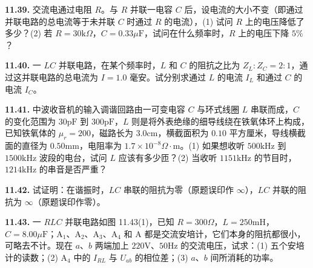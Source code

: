 \begin{center}
  \begin{minipage}[b]{0.47\linewidth}
    \centering
  \end{minipage}\hfill
  \begin{minipage}[b]{0.47\linewidth}
    \centering
  \end{minipage}
\end{center}

\vfill
\newpage

\textbf{11.39.} 交流电通过电阻 $R$。与 $R$ 并联一电容 $C$ 后，设电流的大小不变（即通过并联电路的总电流等于未并联 $C$ 时通过 $R$ 的电流），(1) 试问 $R$ 上的电压降低了多少？(2) 若 $R = 30\mathrm{k}\Omega$，$C = 0.33\mu\mathrm{F}$，试问在什么频率时，$R$ 上的电压下降 $5\%$？

\vfill
\newpage

\textbf{11.40.} 一 $LC$ 并联电路，在某个频率时，$L$ 和 $C$ 的阻抗之比为 $Z_{L}:Z_{C} = 2:1$，通过这并联电路的总电流为 $I = 1.0\text{ 毫安}$。试分别求通过 $L$ 的电流 $I_{L}$ 和通过 $C$ 的电流 $I_{C}$。

\vfill
\newpage

\textbf{11.41.} 中波收音机的输入调谐回路由一可变电容 $C$ 与环式线圈 $L$ 串联而成，$C$ 的变化范围为 $30\mathrm{pF}$ 到 $300\mathrm{pF}$，$L$ 则是将外表绝缘的细导线绕在铁氧体环上构成，已知铁氧体的 $\mu_{r} = 200$，磁路长为 $3.0\mathrm{cm}$，横截面积为 $0.10\text{ 平方厘米}$，导线横截面的直径为 $0.50\mathrm{mm}$，电阻率为 $1.7 \times 10^{-8}\Omega\cdot\mathrm{m}$。(1) 如果想收听 $500\mathrm{kHz}$ 到 $1500\mathrm{kHz}$ 波段的电台，试问 $L$ 应该有多少匝？(2) 当收听 $1151\mathrm{kHz}$ 的节目时，$1214\mathrm{kHz}$ 的串音是否严重？

\vfill
\newpage

\textbf{11.42.} 试证明：在谐振时，$LC$ 串联的阻抗为零（原题误印作 $\infty$），$LC$ 并联的阻抗为 $\infty$（原题误印作零）。

\vfill
\newpage

\textbf{11.43.} 一 $RLC$ 并联电路如图 11.43(1)，已知 $R = 300\Omega$，$L = 250\mathrm{mH}$，$C = 8.00\mu\mathrm{F}$；$\mathrm{A}_{1}$、$\mathrm{A}_{2}$、$\mathrm{A}_{3}$、$\mathrm{A}_{4}$ 和 $\mathrm{A}$ 都是交流安培计，它们本身的阻抗都很小，可略去不计。现在 $a$、$b$ 两端加上 $220\mathrm{V}$、$50\mathrm{Hz}$ 的交流电压，试求：(1) 五个安培计的读数；(2) $\mathrm{A}_{4}$ 中的 $I_{RL}$ 与 $U_{ab}$ 的相位差；(3) $a$、$b$ 间所消耗的功率。

